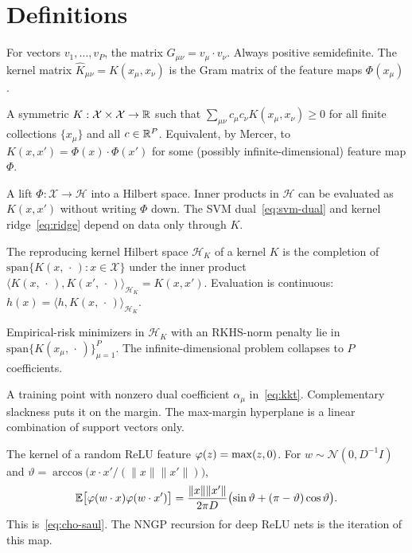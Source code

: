 \section{Definitions}

\begin{description}[style=nextline,leftmargin=1.1em,itemsep=0.55em,font=\normalfont\bfseries]

\item[Gram matrix.]
For vectors $v_1,\ldots,v_P$, the matrix $G_{\mu\nu}=v_\mu\cdot v_\nu$. Always positive semidefinite. The kernel matrix $\hat K_{\mu\nu}=K(x_\mu,x_\nu)$ is the Gram matrix of the feature maps $\Phi(x_\mu)$.

\item[Positive-definite kernel.]
A symmetric $K:\mathcal{X}\times\mathcal{X}\to\mathbb{R}$ such that $\sum_{\mu\nu}c_\mu c_\nu K(x_\mu,x_\nu)\ge 0$ for all finite collections $\{x_\mu\}$ and all $c\in\mathbb{R}^{P}$. Equivalent, by Mercer, to $K(x,x')=\Phi(x)\cdot\Phi(x')$ for some (possibly infinite-dimensional) feature map $\Phi$.

\item[Feature map / kernel trick.]
A lift $\Phi:\mathcal{X}\to\mathcal{H}$ into a Hilbert space. Inner products in $\mathcal{H}$ can be evaluated as $K(x,x')$ without writing $\Phi$ down. The SVM dual~\eqref{eq:svm-dual} and kernel ridge~\eqref{eq:ridge} depend on data only through $K$.

\item[RKHS.]
The reproducing kernel Hilbert space $\mathcal{H}_K$ of a kernel $K$ is the completion of $\mathrm{span}\{K(x,\,\cdot\,):x\in\mathcal{X}\}$ under the inner product $\langle K(x,\,\cdot\,),K(x',\,\cdot\,)\rangle_{\mathcal{H}_K}=K(x,x')$. Evaluation is continuous: $h(x)=\langle h,K(x,\,\cdot\,)\rangle_{\mathcal{H}_K}$.

\item[Representer theorem.]
Empirical-risk minimizers in $\mathcal{H}_K$ with an RKHS-norm penalty lie in $\mathrm{span}\{K(x_\mu,\,\cdot\,)\}_{\mu=1}^{P}$. The infinite-dimensional problem collapses to $P$ coefficients.

\item[Support vector.]
A training point with nonzero dual coefficient $\alpha_\mu$ in~\eqref{eq:kkt}. Complementary slackness puts it on the margin. The max-margin hyperplane is a linear combination of support vectors only.

\item[Cho--Saul formula.]
The kernel of a random ReLU feature $\varphi(z)=\max(z,0)$. For $w\sim\mathcal{N}(0,D^{-1}I)$ and $\vartheta=\arccos\bigl(x\cdot x'/(\|x\|\|x'\|)\bigr)$,
\[
  \mathbb{E}\bigl[\varphi(w\cdot x)\varphi(w\cdot x')\bigr]
  =\frac{\|x\|\|x'\|}{2\pi D}\bigl(\sin\vartheta+(\pi-\vartheta)\cos\vartheta\bigr).
\]
This is~\eqref{eq:cho-saul}. The NNGP recursion for deep ReLU nets is the iteration of this map.


\end{description}
